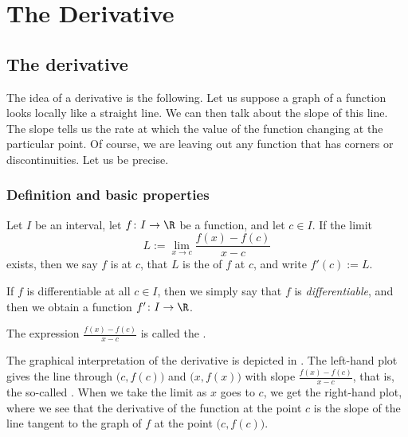 \documentclass[12pt]{book}
\begin{document}
\chapter{The Derivative} \label{der:chapter}


\section{The derivative}
\label{sec:der}


The idea of a derivative is the following.
Let us suppose a graph of a function looks locally like a straight line.
We can then talk about the slope of this line.
The slope tells us 
the rate at which 
the value of the function changing at the particular point.
Of course, we are leaving out any function that has corners or
discontinuities.
Let us be precise.

\subsection*{Definition and basic properties}

\begin{defn}
Let $I$ be an interval, let
$f \colon I \to \R$ be a function, and let $c \in I$.
If 
the limit
\begin{equation*}
L := \lim_{x \to c} \frac{f(x)-f(c)}{x-c} 
\end{equation*}
exists, then we say $f$ is \emph{} at
$c$, that $L$ is the \emph{} of $f$ at $c$,
and write $f'(c) := L$.

\medskip

If $f$ is differentiable at all $c \in I$, then we simply say that
$f$ is \emph{differentiable}, and then we obtain a function
$f' \colon I \to \R$.

\medskip

The expression $\frac{f(x)-f(c)}{x-c}$ is called the
\emph{}.
\end{defn}

The graphical interpretation of the derivative is  depicted in
.
The left-hand plot gives the line through
$\bigl(c,f(c)\bigr)$
and $\bigl(x,f(x)\bigr)$ with slope
$\frac{f(x)-f(c)}{x-c}$, that is,
the so-called \emph{}.
When we take the limit as $x$ goes to $c$,
we get the right-hand plot, where we see
that the derivative of the function
at the point $c$ is the slope of the line tangent to the graph of $f$
at the point $\bigl(c,f(c)\bigr)$.
\end{document}
